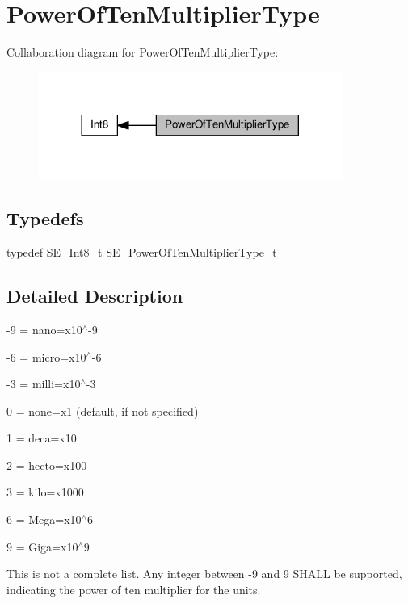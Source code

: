 \hypertarget{group__PowerOfTenMultiplierType}{}\section{Power\+Of\+Ten\+Multiplier\+Type}
\label{group__PowerOfTenMultiplierType}
Collaboration diagram for Power\+Of\+Ten\+Multiplier\+Type\+:\nopagebreak
\begin{figure}[H]
\begin{center}
\leavevmode
\includegraphics[width=281pt]{group__PowerOfTenMultiplierType}
\end{center}
\end{figure}
\subsection*{Typedefs}
\begin{DoxyCompactItemize}
\item 
typedef \hyperlink{group__Int8_ga552ff0f4c1c3df56bf665d9b7663148c}{S\+E\+\_\+\+Int8\+\_\+t} \hyperlink{group__PowerOfTenMultiplierType_gaf0317b781dc8dbb9cb6ac4e44a14fdef}{S\+E\+\_\+\+Power\+Of\+Ten\+Multiplier\+Type\+\_\+t}
\end{DoxyCompactItemize}


\subsection{Detailed Description}
-\/9 = nano=x10$^\wedge$-\/9

-\/6 = micro=x10$^\wedge$-\/6

-\/3 = milli=x10$^\wedge$-\/3

0 = none=x1 (default, if not specified)

1 = deca=x10

2 = hecto=x100

3 = kilo=x1000

6 = Mega=x10$^\wedge$6

9 = Giga=x10$^\wedge$9

This is not a complete list. Any integer between -\/9 and 9 S\+H\+A\+LL be supported, indicating the power of ten multiplier for the units. 

